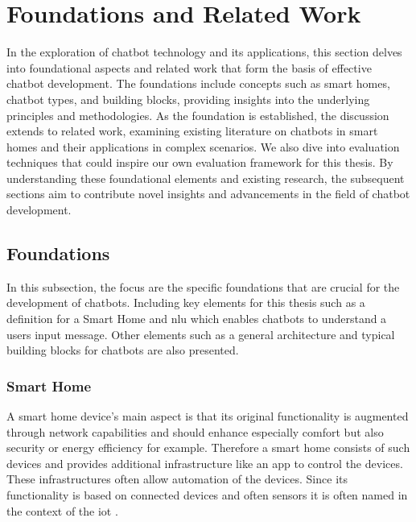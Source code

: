 
\chapter{Foundations and Related Work}
\label{chap:ch2}
\label{chap:foundation}

In the exploration of chatbot technology and its applications, this section delves into foundational aspects and related work that form the basis of effective chatbot development. 
The foundations include concepts such as smart homes, chatbot types, and building blocks, providing insights into the underlying principles and methodologies. 
As the foundation is established, the discussion extends to related work, examining existing literature on chatbots in smart homes and their applications in complex scenarios.
We also dive into evaluation techniques that could inspire our own evaluation framework for this thesis. 
By understanding these foundational elements and existing research, the subsequent sections aim to contribute novel insights and advancements in the field of chatbot development.

\section{Foundations}
\label{sec:foundation}
In this subsection, the focus are the specific foundations that are crucial for the development of chatbots.
Including key elements for this thesis such as a definition for a Smart Home and \gls{nlu} which enables chatbots to understand a users input message.
Other elements such as a general architecture and typical building blocks for chatbots are also presented.

\subsection{Smart Home} 
A smart home device's main aspect is that its original functionality is augmented through network capabilities \cite{schiefer_smart_2015,balakrishnan_smart_2018} and should enhance especially comfort \cite{matsui_information_2018, balakrishnan_smart_2018} but also security \cite{balakrishnan_smart_2018} or energy efficiency \cite{matsui_information_2018, balakrishnan_smart_2018} for example. 
Therefore a smart home consists of such devices and provides additional infrastructure like an app to control the devices. 
These infrastructures often allow automation of the devices.
Since its functionality is based on connected devices and often sensors it is often named in the context of the \gls{iot} \cite{atzori_internet_2010}. 


